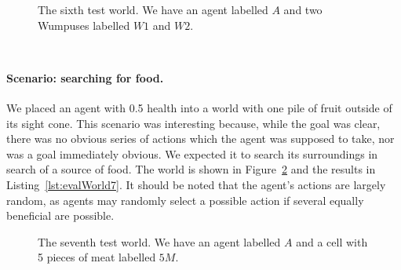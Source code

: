 \begin{figure}
    \centering
    
    \caption{The sixth test world. We have an agent labelled $A$ and two Wumpuses labelled $W1$ and $W2$.}
    \label{fig:evalWorld6}
\end{figure}

\begin{lstlisting}[caption=Actions of an agent with the personality $\personality{W}{W}{W}{W}{F}$ in the scenario ``fight or flight''., label=lst:evalWorld6_1]

\end{lstlisting}

\begin{lstlisting}[caption=Actions of an agent with the personality $\personality{S}{W}{S}{W}{F}$ in the scenario ``fight or flight''., label=lst:evalWorld6_2]

\end{lstlisting}

\paragraph{Scenario: searching for food.} We placed an agent with 0.5 health into a world with one pile of fruit outside of its sight cone. This scenario was interesting because, while the goal was clear, there was no obvious series of actions which the agent was supposed to take, nor was a goal immediately obvious. We expected it to search its surroundings in search of a source of food. The world is shown in Figure~\ref{fig:evalWorld7} and the results in Listing~\ref{lst:evalWorld7}. It should be noted that the agent's actions are largely random, as agents may randomly select a possible action if several equally beneficial are possible.

\begin{figure}
    \centering
    
    \caption{The seventh test world. We have an agent labelled $A$ and a cell with 5 pieces of meat labelled $5M$.}
    \label{fig:evalWorld7}
\end{figure}

\begin{lstlisting}[caption=Actions in the scenario ``searching for food''., label=lst:evalWorld7]

\end{lstlisting}

